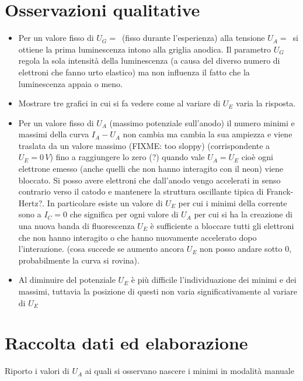 \documentclass[10pt,a4paper]{article}
\begin{document}
\section{Osservazioni qualitative}
\begin{itemize}
\item Per un valore fisso di $U_G = \, $ (fisso durante l'esperienza) alla tensione $U_A = \, $ si ottiene la prima luminescenza intono alla griglia anodica. Il parametro $U_G$ regola la sola intensità della luminescenza (a causa del diverso numero di elettroni che fanno urto elastico) ma non influenza il fatto che la luminescenza appaia o meno.
\item Mostrare tre grafici in cui si fa vedere come al variare di $U_E$ varia la risposta.

\item Per un valore fisso di $U_A$ (massimo potenziale sull'anodo) il numero minimi e massimi della curva $I_A-U_A$ non cambia ma cambia la sua ampiezza e viene traslata da un valore massimo (FIXME: too sloppy) (corrispondente a $U_E = 0 \, V$) fino a raggiungere lo zero (?) quando vale $U_A = U_E$ cioè ogni elettrone emesso (anche quelli che non hanno interagito con il neon) viene bloccato. Si posso avere elettroni che dall'anodo vengo accelerati in senso contrario verso il catodo e mantenere la struttura oscillante tipica di Franck-Hertz?. In particolare esiste un valore di $U_E$ per cui i minimi della corrente sono a $I_C = 0$ che significa per ogni valore di $U_A$ per cui si ha la creazione di una nuova banda di fluorescenza $U_E$ è sufficiente a bloccare tutti gli elettroni che non hanno interagito o che hanno nuovamente accelerato dopo l'interazione. (cosa succede se aumento  ancora $U_E$ non posso andare sotto 0, probabilmente la curva si rovina).
\item Al diminuire del potenziale $U_E$ è più difficile l'individuazione dei minimi e dei massimi, tuttavia la posizione di questi non varia significativamente al 
variare di $U_E$ 
\end{itemize}
 

\section{Raccolta dati ed elaborazione}


Riporto i valori di $U_A$ ai quali si osservano nascere i minimi in modalità manuale
\end{document}
